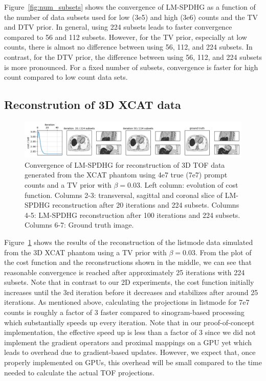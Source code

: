 Figure~\ref{fig:num_subsets} shows the convergence of LM-SPDHG as a function of the number of data
subsets used for low (3e5) and high (3e6) counts and the TV and DTV prior.
In general, using 224 subsets leads to faster convergence compared to 56 and 112 subsets.
However, for the TV prior, especially at low counts, there is almost no difference between using
56, 112, and 224 subsets.
In contrast, for the DTV prior, the difference between using 56, 112, and 224 subsets is more
pronounced.
For a fixed number of subsets, convergence is faster for high count compared to low count data sets.


\subsection*{Reconstrution of 3D XCAT data}

\begin{figure}
  \centering
    \includegraphics[width=1.0\textwidth]{figure6_xcat_TV_3e-2_4e7.png}
  \caption{Convergence of LM-SPDHG for reconstruction of 3D TOF data generated from the XCAT phantom
           using 4e7 true (7e7) prompt counts and a TV prior with $\beta = 0.03$.
           Left column: evolution of cost function. 
           Columns 2-3: transversal, sagittal and coronal
           slice of LM-SPDHG reconstruction after 20 iterations and 224 subsets.
           Columns 4-5: LM-SPDHG reconstruction after 100 iterations and 224 subsets.
           Columns 6-7: Ground truth image.}
  \label{fig:xcat}
\end{figure}


Figure~\ref{fig:xcat} shows the results of the reconstruction of the listmode data simulated
from the 3D XCAT phantom using a TV prior with $\beta = 0.03$. 
From the plot of the cost function and the reconstructions shown in the middle, we can see
that reasonable convergence is reached after approximately 25 iterations with 224 subsets.
Note that in contrast to our 2D experiments, the cost function initially increases until the 3rd iteration before it decreases and stabilizes after around 25 iterations.
As mentioned above, calculating the projections in listmode for 7e7 counts is roughly a factor
of 3 faster compared to sinogram-based processing which substantially speeds up every iteration.
Note that in our proof-of-concept implementation, the effective speed up is less than a 
factor of 3 since we did not implement the gradient operators and proximal mappings on a GPU yet
which leads to overhead due to gradient-based updates.
However, we expect that, once properly implemented on GPUs, this overhead will be small compared to
the time needed to calculate the actual TOF projections.


